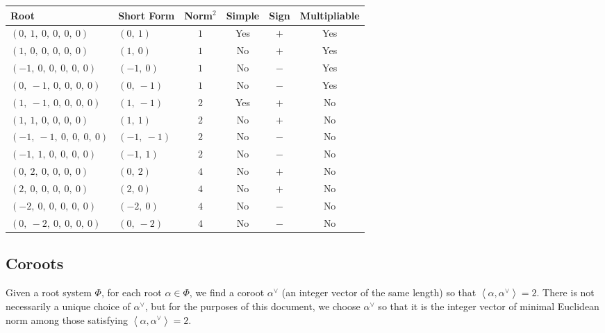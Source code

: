 \documentclass[11pt]{article}
\newcommand{\noi}{\noindent}
\newcommand{\la}{\left\langle}
\newcommand{\ra}{\right\rangle}
\theoremstyle{definition}
\begin{document}
\noi \begin{tabular}{|l|l|c|c|c|c|}
    \hline
    \textbf{Root} & \textbf{Short Form} & \textbf{Norm$^2$} & \textbf{Simple} & \textbf{Sign} & \textbf{Multipliable} \\
    \hline
    $\left( 0, \  1, \  0, \  0, \  0, \  0\right)$ & $\left( 0, \  1\right)$ & $1$ & Yes & $+$ & Yes \\
    \hline
    $\left( 1, \  0, \  0, \  0, \  0, \  0\right)$ & $\left( 1, \  0\right)$ & $1$ & No & $+$ & Yes \\
    \hline
    $\left( -1, \  0, \  0, \  0, \  0, \  0\right)$ & $\left( -1, \  0\right)$ & $1$ & No & $-$ & Yes \\
    \hline
    $\left( 0, \  -1, \  0, \  0, \  0, \  0\right)$ & $\left( 0, \  -1\right)$ & $1$ & No & $-$ & Yes \\
    \hline
    $\left( 1, \  -1, \  0, \  0, \  0, \  0\right)$ & $\left( 1, \  -1\right)$ & $2$ & Yes & $+$ & No \\
    \hline
    $\left( 1, \  1, \  0, \  0, \  0, \  0\right)$ & $\left( 1, \  1\right)$ & $2$ & No & $+$ & No \\
    \hline
    $\left( -1, \  -1, \  0, \  0, \  0, \  0\right)$ & $\left( -1, \  -1\right)$ & $2$ & No & $-$ & No \\
    \hline
    $\left( -1, \  1, \  0, \  0, \  0, \  0\right)$ & $\left( -1, \  1\right)$ & $2$ & No & $-$ & No \\
    \hline
    $\left( 0, \  2, \  0, \  0, \  0, \  0\right)$ & $\left( 0, \  2\right)$ & $4$ & No & $+$ & No \\
    \hline
    $\left( 2, \  0, \  0, \  0, \  0, \  0\right)$ & $\left( 2, \  0\right)$ & $4$ & No & $+$ & No \\
    \hline
    $\left( -2, \  0, \  0, \  0, \  0, \  0\right)$ & $\left( -2, \  0\right)$ & $4$ & No & $-$ & No \\
    \hline
    $\left( 0, \  -2, \  0, \  0, \  0, \  0\right)$ & $\left( 0, \  -2\right)$ & $4$ & No & $-$ & No \\
    \hline
\end{tabular}


\subsection{Coroots}

Given a root system $\Phi$, for each root $\alpha \in \Phi$, we find a coroot $\alpha^\vee$ (an integer vector of the same length) so that $\la \alpha, \alpha^\vee \ra = 2$. There is not necessarily a unique choice of $\alpha^\vee$, but for the purposes of this document, we choose $\alpha^\vee$ so that it is the integer vector of minimal Euclidean norm among those satisfying $\la \alpha, \alpha^\vee \ra = 2$.
\end{document}
